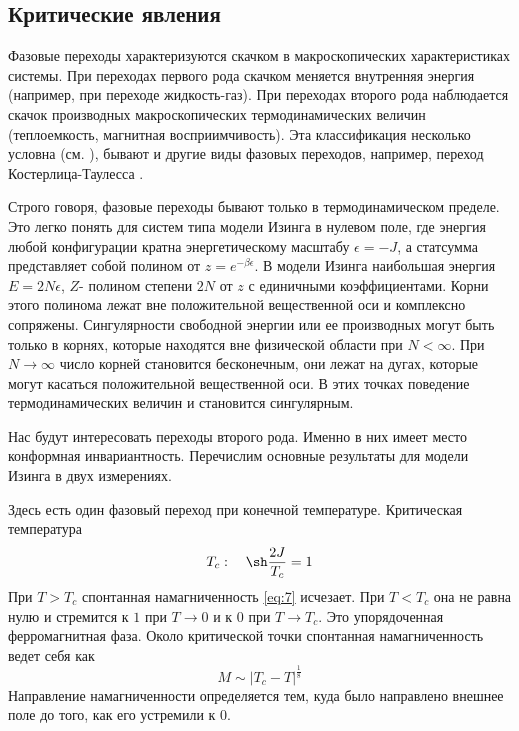 \documentclass[a4paper,12pt]{article} \usepackage[utf8x]{inputenc} \usepackage[russian]{babel}
\theoremstyle{definition} \newtheorem{corollary}{Corollary}[theorem] \theoremstyle{definition}
\begin{document}
\subsection{Критические явления}
\label{sec:critical-phenomena}

Фазовые переходы характеризуются скачком в макроскопических характеристиках системы. При переходах
первого рода скачком меняется внутренняя энергия (например, при переходе жидкость-газ). При
переходах второго рода наблюдается скачок производных макроскопических термодинамических величин
(теплоемкость, магнитная восприимчивость). Эта классификация несколько условна (см.
\cite{ma2000modern,ma1980}), бывают и другие виды фазовых переходов, например, переход
Костерлица-Таулесса \cite{0022-3719-6-7-010}.

Строго говоря, фазовые переходы бывают только в термодинамическом пределе. Это легко понять для
систем типа модели Изинга в нулевом поле, где энергия любой конфигурации кратна энергетическому
масштабу $\epsilon=-J$, а статсумма представляет собой полином от $z=e^{-\beta\epsilon}$. В модели
Изинга наибольшая энергия $E=2N\epsilon$, $Z$- полином степени $2N$ от $z$ с единичными
коэффициентами. Корни этого полинома лежат вне положительной вещественной оси и комплексно
сопряжены. Сингулярности свободной энергии или ее производных могут быть только в корнях, которые
находятся вне физической области при $N<\infty$. При $N\to \infty$ число корней становится
бесконечным, они лежат на дугах, которые могут касаться положительной вещественной оси. В этих
точках поведение термодинамических величин и становится сингулярным.

Нас будут интересовать переходы второго рода. Именно в них имеет место конформная инвариантность.
Перечислим основные результаты для модели Изинга в двух измерениях.

Здесь есть один фазовый переход при конечной температуре. Критическая температура
\begin{equation}
  \label{eq:27} T_c:\quad \sh \frac{2J}{T_c}=1
\end{equation} При $T>T_c$ спонтанная намагниченность \eqref{eq:7} исчезает. При $T<T_c$ она не
равна нулю и стремится к $1$ при $T\to 0$ и к $0$ при $T\to T_c$. Это упорядоченная ферромагнитная
фаза. Около критической точки спонтанная намагниченность ведет себя как
\begin{equation}
  \label{eq:28} M\sim \left|T_c-T\right|^{\frac{1}{8}}
\end{equation} Направление намагниченности определяется тем, куда было направлено внешнее поле до
того, как его устремили к $0$.
\end{document}
